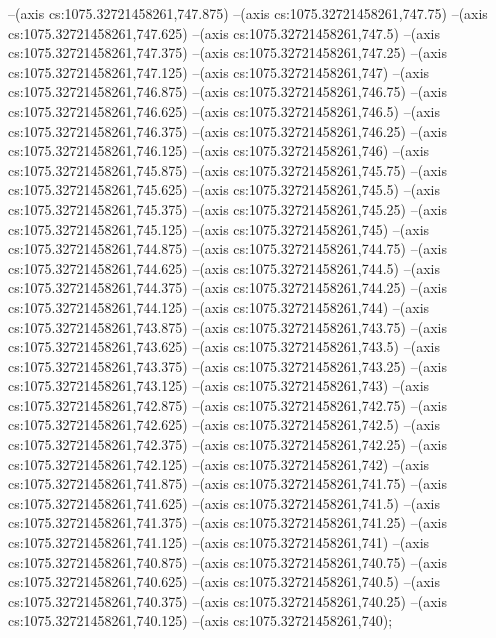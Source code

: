 --(axis cs:1075.32721458261,747.875)
--(axis cs:1075.32721458261,747.75)
--(axis cs:1075.32721458261,747.625)
--(axis cs:1075.32721458261,747.5)
--(axis cs:1075.32721458261,747.375)
--(axis cs:1075.32721458261,747.25)
--(axis cs:1075.32721458261,747.125)
--(axis cs:1075.32721458261,747)
--(axis cs:1075.32721458261,746.875)
--(axis cs:1075.32721458261,746.75)
--(axis cs:1075.32721458261,746.625)
--(axis cs:1075.32721458261,746.5)
--(axis cs:1075.32721458261,746.375)
--(axis cs:1075.32721458261,746.25)
--(axis cs:1075.32721458261,746.125)
--(axis cs:1075.32721458261,746)
--(axis cs:1075.32721458261,745.875)
--(axis cs:1075.32721458261,745.75)
--(axis cs:1075.32721458261,745.625)
--(axis cs:1075.32721458261,745.5)
--(axis cs:1075.32721458261,745.375)
--(axis cs:1075.32721458261,745.25)
--(axis cs:1075.32721458261,745.125)
--(axis cs:1075.32721458261,745)
--(axis cs:1075.32721458261,744.875)
--(axis cs:1075.32721458261,744.75)
--(axis cs:1075.32721458261,744.625)
--(axis cs:1075.32721458261,744.5)
--(axis cs:1075.32721458261,744.375)
--(axis cs:1075.32721458261,744.25)
--(axis cs:1075.32721458261,744.125)
--(axis cs:1075.32721458261,744)
--(axis cs:1075.32721458261,743.875)
--(axis cs:1075.32721458261,743.75)
--(axis cs:1075.32721458261,743.625)
--(axis cs:1075.32721458261,743.5)
--(axis cs:1075.32721458261,743.375)
--(axis cs:1075.32721458261,743.25)
--(axis cs:1075.32721458261,743.125)
--(axis cs:1075.32721458261,743)
--(axis cs:1075.32721458261,742.875)
--(axis cs:1075.32721458261,742.75)
--(axis cs:1075.32721458261,742.625)
--(axis cs:1075.32721458261,742.5)
--(axis cs:1075.32721458261,742.375)
--(axis cs:1075.32721458261,742.25)
--(axis cs:1075.32721458261,742.125)
--(axis cs:1075.32721458261,742)
--(axis cs:1075.32721458261,741.875)
--(axis cs:1075.32721458261,741.75)
--(axis cs:1075.32721458261,741.625)
--(axis cs:1075.32721458261,741.5)
--(axis cs:1075.32721458261,741.375)
--(axis cs:1075.32721458261,741.25)
--(axis cs:1075.32721458261,741.125)
--(axis cs:1075.32721458261,741)
--(axis cs:1075.32721458261,740.875)
--(axis cs:1075.32721458261,740.75)
--(axis cs:1075.32721458261,740.625)
--(axis cs:1075.32721458261,740.5)
--(axis cs:1075.32721458261,740.375)
--(axis cs:1075.32721458261,740.25)
--(axis cs:1075.32721458261,740.125)
--(axis cs:1075.32721458261,740);


